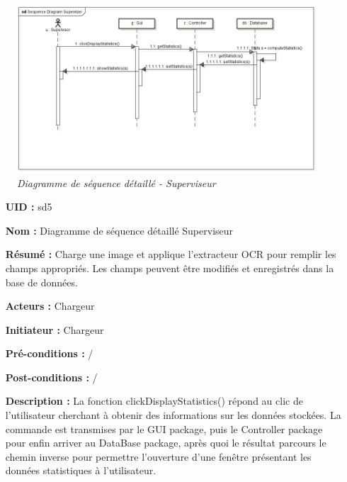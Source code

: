 \begin{figure}[!h]
	\begin{center}
		\includegraphics[scale = 0.6]{img/seqDiagSupervizerDetailled.png}
	\end{center}
	\caption{\it Diagramme de séquence détaillé - Superviseur}
	\label{seqDiagSuperDet}
\end{figure}

\newpage
\begin{itemize}
	\item[{\bf UID :}] sd5
	\item[{\bf Nom :}] Diagramme de séquence détaillé Superviseur
	\item[{\bf Résumé :}]  Charge une image et applique l'extracteur OCR pour remplir les champs appropriés. Les champs peuvent être modifiés et enregistrés dans la base de données.
	\item[{\bf Acteurs :}] Chargeur
	\item[{\bf Initiateur :}] Chargeur
	\item[{\bf Pré-conditions :}]  /
	\item[{\bf Post-conditions :}]  /
	\smallbreak
	\item[{\bf Description :}]
	La fonction clickDisplayStatistics() répond au clic de l'utilisateur cherchant à obtenir des informations sur les données stockées. La commande est transmises par le GUI package, puis le Controller package pour enfin arriver au DataBase package, après quoi le résultat parcours le chemin inverse pour permettre l'ouverture d'une fenêtre présentant les données statistiques à l'utilisateur.
\end{itemize}

